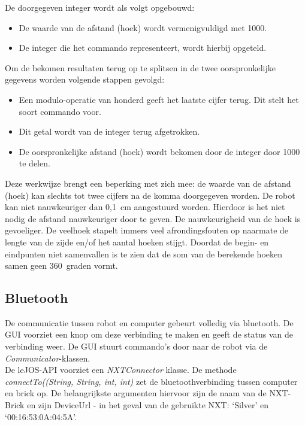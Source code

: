 \documentclass[t1]{penoverslag}
\begin{document}
De doorgegeven integer wordt als volgt opgebouwd:

\begin{itemize}
\item De waarde van de afstand (hoek) wordt vermenigvuldigd met 1000.
\item De integer die het commando representeert, wordt hierbij opgeteld.
\end{itemize}

Om de bekomen resultaten terug op te splitsen in de twee oorspronkelijke gegevens worden volgende stappen gevolgd:

\begin{itemize}
\item Een modulo-operatie van honderd geeft het laatste cijfer terug. Dit stelt het soort commando voor.
\item Dit getal wordt van de integer terug afgetrokken.
\item De oorspronkelijke afstand (hoek) wordt bekomen door de integer door 1000 te delen.
\end{itemize}

Deze werkwijze brengt een beperking met zich mee: de waarde van de afstand (hoek) kan slechts tot twee cijfers na de komma doorgegeven worden. De robot kan niet nauwkeuriger dan 0,1~cm aangestuurd worden. Hierdoor is het niet nodig de afstand nauwkeuriger door te geven. De nauwkeurigheid van de hoek is gevoeliger. De veelhoek stapelt immers veel afrondingsfouten op naarmate de lengte van de zijde en/of het aantal hoeken stijgt. Doordat de begin- en eindpunten niet samenvallen is te zien dat de som van de berekende hoeken samen geen 360~graden vormt. 

\subsection{Bluetooth} %
\label{ssec:bluetooth}
De communicatie tussen robot en computer gebeurt volledig via bluetooth. De GUI voorziet een knop om deze verbinding te maken en geeft de status van de verbinding weer. De GUI stuurt commando's door naar de robot via de \textit{Communicator}-klassen.\\

De leJOS-API \cite{leJOS} voorziet een \textit{NXTConnector} klasse. De methode \textit{connectTo((String, String, int, int)} zet de bluetoothverbinding tussen computer en brick op. De belangrijkste argumenten hiervoor zijn de naam van de NXT-Brick en zijn DeviceUrl  - in het geval van de gebruikte NXT: `Silver' en `00:16:53:0A:04:5A'.\\
\end{document}
